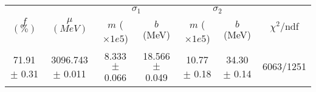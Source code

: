 \begin{tabular}{c|c|cc|cc||c}
 \multirow{2}{*}{$f$ $(\%)$} & \multirow{2}{*}{$\mu$ $(MeV)$} & \multicolumn{2}{|c|}{$\sigma_1$} & \multicolumn{2}{|c||}{$\sigma_2$} & \multirow{2}{*}{$\chi^2/$ndf} \\
 & & $m$ ($\times1e5$) & $b$ (MeV) & $m$ ($\times1e5$) & $b$ (MeV) & \\
\hline
71.91 $\pm$ 0.31 & 3096.743 $\pm$ 0.011 & 8.333 $\pm$ 0.066 & 18.566 $\pm$ 0.049 & 10.77 $\pm$ 0.18 & 34.30 $\pm$ 0.14 & 6063/1251\\
\end{tabular}
